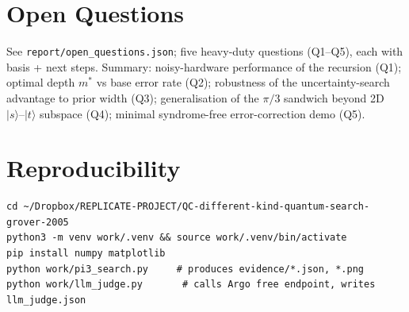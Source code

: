 \documentclass[11pt]{article}
\begin{document}
\section{Open Questions}
See \texttt{report/open\_questions.json}; five heavy-duty questions (Q1--Q5),
each with basis + next steps. Summary: noisy-hardware performance of the
recursion (Q1); optimal depth $m^*$ vs base error rate (Q2); robustness of
the uncertainty-search advantage to prior width (Q3); generalisation of the
$\pi/3$ sandwich beyond 2D $|s\rangle\text{--}|t\rangle$ subspace (Q4);
minimal syndrome-free error-correction demo (Q5).

\section{Reproducibility}
\begin{lstlisting}[basicstyle=\ttfamily\small, frame=single]
cd ~/Dropbox/REPLICATE-PROJECT/QC-different-kind-quantum-search-grover-2005
python3 -m venv work/.venv && source work/.venv/bin/activate
pip install numpy matplotlib
python work/pi3_search.py     # produces evidence/*.json, *.png
python work/llm_judge.py       # calls Argo free endpoint, writes llm_judge.json
\end{lstlisting}
\end{document}
